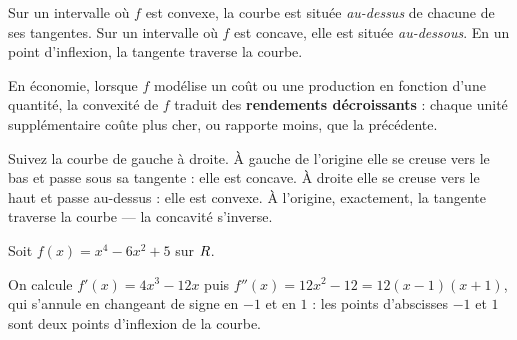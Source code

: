 \begin{propriete}
Sur un intervalle où $f$ est convexe, la courbe est située \emph{au-dessus} de
chacune de ses tangentes. Sur un intervalle où $f$ est concave, elle est
située \emph{au-dessous}. En un point d'inflexion, la tangente traverse la
courbe.

En économie, lorsque $f$ modélise un coût ou une production en fonction d'une
quantité, la convexité de $f$ traduit des \textbf{rendements décroissants} :
chaque unité supplémentaire coûte plus cher, ou rapporte moins, que la
précédente.
\end{propriete}

\begin{visualisation}
\begin{center}
\end{center}

Suivez la courbe de gauche à droite. À gauche de l'origine elle se creuse vers
le bas et passe sous sa tangente : elle est concave. À droite elle se creuse
vers le haut et passe au-dessus : elle est convexe. À l'origine, exactement,
la tangente traverse la courbe — la concavité s'inverse.
\end{visualisation}

\begin{exemple}
Soit $f(x) = x^{4} - 6x^{2} + 5$ sur $R$.

On calcule $f'(x) = 4x^{3} - 12x$ puis $f''(x) = 12x^{2} - 12 = 12(x-1)(x+1)$,
qui s'annule en changeant de signe en $-1$ et en $1$ : les points d'abscisses
$-1$ et $1$ sont deux points d'inflexion de la courbe.
\end{exemple}

